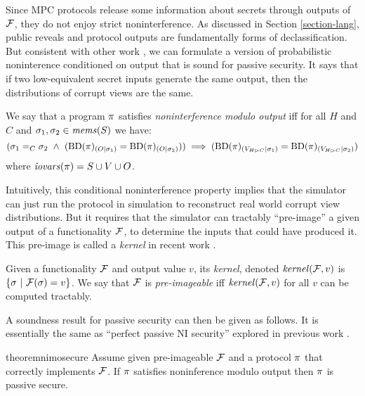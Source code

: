 Since MPC protocols release some information about secrets through
outputs of $\mathcal{F}$, they do not enjoy strict noninterference.  As
discussed in Section \ref{section-lang}, public reveals and protocol
outputs are fundamentally forms of declassification.  But consistent
with other work \cite{8429300}, we can formulate a version of
probabilistic noninterence conditioned on output that is sound
for passive security. It says that if two low-equivalent secret
inputs generate the same output, then the distributions of corrupt
views are the same. 
\begin{definition}
  \label{definition-NIMO}
  We say that a program $\pi$ satisfies \emph{noninterference modulo output}
  iff for all $H$ and $C$ and 
  $\sigma_1,\sigma_2 \in \mathit{mems}(S)$ we have:
  $$
  (\store_1 =_C \store_2 \ \wedge \ 
  (\condd{\progtt(\prog)}{O}{\store_1} = \condd{\progtt(\prog)}{O}{\store_2}))
  \implies 
  (\condd{\progtt(\prog)}{\houtputs}{\store_1} = \condd{\progtt(\prog)}{\houtputs}{\store_2})
  $$
  where $\mathit{iovars}(\pi) = S \cup V \cup O$.
\end{definition}
Intuitively, this conditional noninterference property implies that
the simulator can just run the protocol in simulation to
reconstruct real world corrupt view distributions. But it requires
that the simulator can tractably ``pre-image'' a given output of
a functionality $\mathcal{F}$, to determine the inputs that
could have produced it. This pre-image is called a
\emph{kernel} in recent work \cite{XXX}.
\begin{definition}
  Given a functionality $\mathcal{F}$ and output value $v$, its
  \emph{kernel}, denoted $\mathit{kernel}(\mathcal{F},v)$ is
  $
  \{ \sigma\ |\ \mathcal{F}(\sigma) = v \}
  $.
  We say that $\mathcal{F}$ is \emph{pre-imageable} iff $\mathit{kernel}(\mathcal{F}, v)$ for all
  $v$ can be computed tractably.
\end{definition}
A soundness result for passive security can then be given as follows.
It is essentially the same as ``perfect passive NI security'' explored
in previous work \cite{8429300}.  
\begin{restatable}{theorem}{nimosecure}
  \label{theorem-nimo}
  Assume given pre-imageable $\mathcal{F}$ and a protocol $\pi$ that
  correctly implements $\mathcal{F}$.  If $\pi$ satisfies noninference modulo output
  then $\pi$ is passive secure.
\end{restatable}

